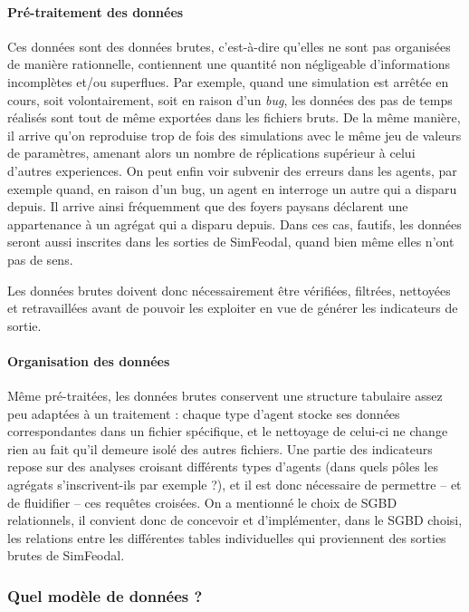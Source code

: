 	\paragraph*{Pré-traitement des données}
	Ces données sont des données \og brutes\fg{}, c'est-à-dire qu'elles ne sont pas organisées de manière rationnelle, contiennent une quantité non négligeable d'informations incomplètes et/ou superflues.
	Par exemple, quand une simulation est arrêtée en cours, soit volontairement, soit en raison d'un \textit{bug}, les données des pas de temps réalisés sont tout de même exportées dans les fichiers bruts.
	De la même manière, il arrive qu'on reproduise trop de fois des simulations avec le même jeu de valeurs de paramètres, amenant alors un nombre de réplications supérieur à celui d'autres experiences.
	On peut enfin voir subvenir des erreurs dans les agents, par exemple quand, en raison d'un bug, un agent en interroge un autre qui a disparu depuis.
	Il arrive ainsi fréquemment que des foyers paysans déclarent une appartenance à un agrégat qui a disparu depuis.
	Dans ces cas, fautifs, les données seront aussi inscrites dans les sorties de SimFeodal, quand bien même elles n'ont pas de sens.

	Les données brutes doivent donc nécessairement être vérifiées, filtrées, nettoyées et retravaillées avant de pouvoir les exploiter en vue de générer les indicateurs de sortie.

	\paragraph*{Organisation des données}
	Même pré-traitées, les données brutes conservent une structure tabulaire assez peu adaptées à un traitement : chaque type d'agent stocke ses données correspondantes dans un fichier spécifique, et le nettoyage de celui-ci ne change rien au fait qu'il demeure isolé des autres fichiers.
	Une partie des indicateurs repose sur des analyses croisant différents types d'agents (dans quels pôles les agrégats s'inscrivent-ils par exemple ?), et il est donc nécessaire de permettre -- et de fluidifier -- ces requêtes croisées.
	On a mentionné le choix de SGBD relationnels, il convient donc de concevoir et d'implémenter, dans le SGBD choisi, les relations entre les différentes tables individuelles qui proviennent des sorties brutes de SimFeodal.

	
	
		\subsubsection{Quel modèle de données ?}
